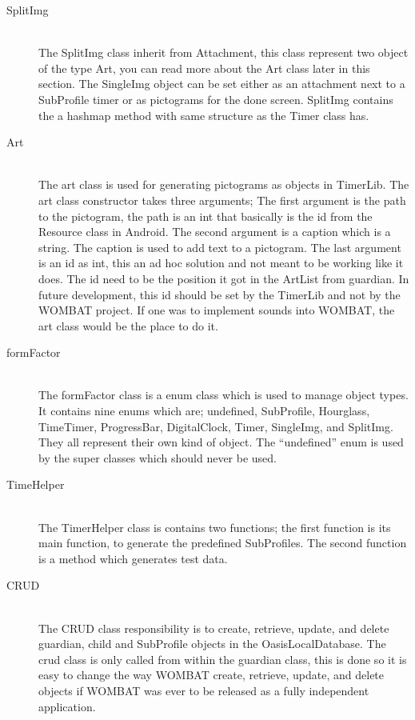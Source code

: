 \begin{description}
	\item[SplitImg] \hfill \\
    The SplitImg class inherit from Attachment, this class represent two object of the type Art, you can read more about the Art class later in this section. The SingleImg object can be set either as an attachment next to a SubProfile timer or as pictograms for the done screen. SplitImg contains the a hashmap method with same structure as the Timer class has.

  \item[Art] \hfill \\
  The art class is used for generating pictograms as objects in TimerLib. The art class constructor takes three arguments; The first argument is the path to the pictogram, the path is an int that basically is the id from the Resource class in Android. The second argument is a caption which is a string. The caption is used to add text to a pictogram. The last argument is an id as int, this an ad hoc solution and not meant to be working like it does. The id need to be the position it got in the ArtList from guardian. In future development, this id should be set by the TimerLib and not by the WOMBAT project. If one was to implement sounds into WOMBAT, the art class would be the place to do it.
	
  \item[formFactor] \hfill \\
	The formFactor class is a enum class which is used to manage object types. It contains nine enums which are; undefined, SubProfile, Hourglass, TimeTimer, ProgressBar, DigitalClock, Timer, SingleImg, and SplitImg. They all represent their own kind of object. The "`undefined"' enum is used by the super classes which should never be used.
	
	\item[TimeHelper] \hfill \\
  The TimerHelper class is contains two functions; the first function is its main function, to generate the predefined SubProfiles. The second function is a method which generates test data.	
	
  \item[CRUD] \hfill \\
	The CRUD class responsibility is to create, retrieve, update, and delete guardian, child and SubProfile objects in the OasisLocalDatabase. The crud class is only called from within the guardian class, this is done so it is easy to change the way WOMBAT create, retrieve, update, and delete objects if WOMBAT was ever to be released as a fully independent application.
	\end{description}

